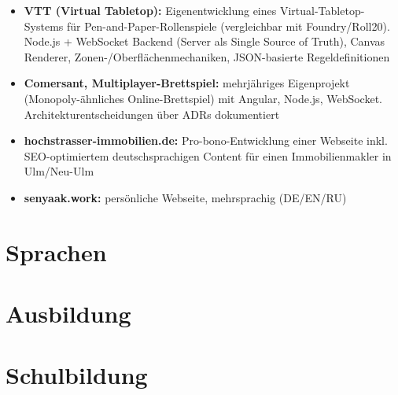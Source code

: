 \begin{itemize}
  \item \textbf{VTT (Virtual Tabletop):} Eigenentwicklung eines Virtual-Tabletop-Systems für Pen-and-Paper-Rollenspiele (vergleichbar mit Foundry/Roll20). Node.js + WebSocket Backend (Server als Single Source of Truth), Canvas Renderer, Zonen-/Oberflächenmechaniken, JSON-basierte Regeldefinitionen
  \item \textbf{Comersant, Multiplayer-Brettspiel:} mehrjähriges Eigenprojekt (Monopoly-ähnliches Online-Brettspiel) mit Angular, Node.js, WebSocket. Architekturentscheidungen über ADRs dokumentiert
  \item \textbf{hochstrasser-immobilien.de:} Pro-bono-Entwicklung einer Webseite inkl. SEO-optimiertem deutschsprachigen Content für einen Immobilienmakler in Ulm/Neu-Ulm
  \item \textbf{senyaak.work:} persönliche Webseite, mehrsprachig (DE/EN/RU)
\end{itemize}

\section*{Sprachen}


\section*{Ausbildung}


\section*{Schulbildung}

